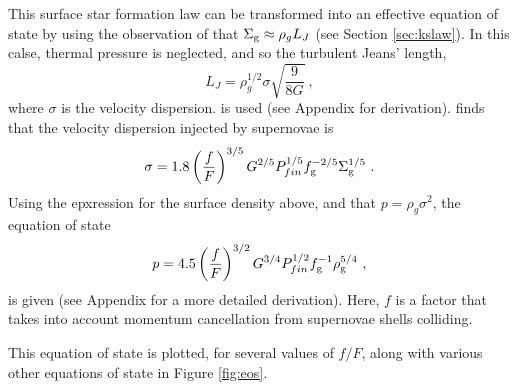 This surface star formation law can be transformed into an effective equation of state by using the observation of \citet{schaye_star_2004} that $\Sigma_\mathrm{g} \approx \rho_g L_J$ (see Section \ref{sec:kslaw}).
In this calse, thermal pressure is neglected, and so the turbulent Jeans' length,
\begin{equation}
\label{eqn:jeans}
L_J = \rho_g^{1/2} \sigma \sqrt{\frac{9}{8G}}~,
\end{equation}
where $\sigma$ is the velocity dispersion.
is used (see Appendix for derivation).
\citet{martizzi_supernova_2015} finds that the velocity dispersion injected by supernovae is
\begin{equation}
\label{eqn:martdisp}
\sigma = 1.8 \left(\frac{f}{F}\right)^{{3/5}} G^{{2/5}} P_{fin}^{{1/5}} f_\mathrm{g}^{{-2/5}} \Sigma_\mathrm{g}^{{1/5}}~.
\end{equation}
Using the epxression for the surface density above, and that $p = \rho_g \sigma^2$, the equation of state
\begin{equation}
\label{eqn:eos}
p = 4.5\left(\frac{f}{F}\right)^{{3/2}} G^{{3/4}} P_{fin}^{{1/2}} f_\mathrm{g}^{-1} \rho_\mathrm{g}^{{5/4}}~,
\end{equation}
is given (see Appendix for a more detailed derivation).
Here, $f$ is a factor that takes into account momentum cancellation from supernovae shells colliding.

This equation of state is plotted, for several values of $f/F$, along with various other equations of state in Figure \ref{fig:eos}.

